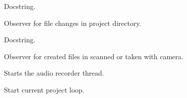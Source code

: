 \documentclass[letterpaper,10pt,english]{sphinxmanual}
\begin{document}
\begin{fulllineitems}
\begin{fulllineitems}
\end{fulllineitems}


\begin{fulllineitems}
\label{state:state.State.set_observers}
Docstring.

\end{fulllineitems}


\begin{fulllineitems}
\label{state:state.State.set_project_observer}
Observer for file changes in project directory.

\end{fulllineitems}


\begin{fulllineitems}
\label{state:state.State.set_responsive}
Docstring.

\end{fulllineitems}


\begin{fulllineitems}
\label{state:state.State.set_scan_observer}
Observer for created files in scanned or taken with camera.

\end{fulllineitems}


\begin{fulllineitems}
\label{state:state.State.start_audio_recorder}
Starts the audio recorder thread.

\end{fulllineitems}


\begin{fulllineitems}
\label{state:state.State.start_current_project}
Start current project loop.


\end{fulllineitems}
\end{fulllineitems}
\end{document}
